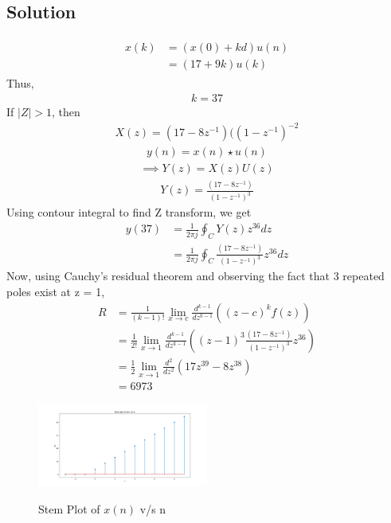 \documentclass[journal,12pt,twocolumn]{IEEEtran}
\theoremstyle{remark}
\begin{document}
\subsection{Solution}
\begin{table}[ht]

\end{table}
\begin{align}
\begin{aligned}
\label{eq:1}x(k) &= (x(0) + kd)u(n)\\
&=(17+9k)u(k)
\end{aligned}
\end{align}
Thus,
\begin{align}{k = 37}\end{align}
If $|Z|>1$, then
\begin{align}\label{8}X(z) = (17-8z^{-1})({(1-z^{-1})}^{-2}\end{align}
\begin{align}y(n) = x(n) \star u(n)\end{align}
\begin{align}\implies Y(z) = X(z)U(z)\end{align}
\begin{align}Y(z) = \frac{(17-8z^{-1})}{(1-z^{-1})^{3}}\end{align}
\bigskip
Using contour integral to find Z transform, we get
\begin{align}
    y(37) &= \frac{1}{2\pi j} \oint _C Y(z)z^{36}dz\\
    &= \frac{1}{2\pi j} \oint _C \frac{(17-8z^{-1})}{(1-z^{-1})^{3}}z^{36}dz
\end{align}
Now, using Cauchy's residual theorem and observing the fact that 3 repeated poles exist at z = 1, 
\begin{align}
    R &= \frac{1}{(k-1)!}\lim_{x \to c}\frac{d^{k-1}}{dz^{k-1}}((z-c)^kf(z))\\
    &= \frac{1}{2!}\lim_{x \to 1}\frac{d^{k-1}}{dz^{k-1}}((z-1)^3\frac{(17-8z^{-1})}{(1-z^{-1})^{3}}z^{36})\\
    &=\frac{1}{2}\lim_{x \to 1}\frac{d^2}{dz^2}(17z^{39} - 8z^{38})\\
    &= 6973
\end{align}
\begin{flushleft}
\begin{figure}[h]
\renewcommand\thefigure{1}
    \caption{Stem Plot of $x(n)$ v/s n}
    \includegraphics[width=0.5\textwidth]{figs/x(n)_plot.png}
    \label{fig:stem-plot}
\end{figure}
\end{flushleft}
\end{document}
